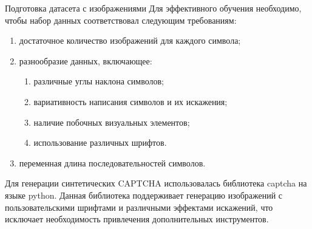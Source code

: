 \documentclass[12pt,a4paper,mathserif]{beamer}
\begin{document}
\begin{frame}{Подготовка датасета с изображениями}
    \setlength{\parindent}{0.5cm}
    Для эффективного обучения необходимо, чтобы набор данных соответствовал следующим требованиям:

    \begin{enumerate}
        \item достаточное количество изображений для каждого символа;
        \item разнообразие данных, включающее:
        \begin{enumerate}
            \item различные углы наклона символов;
            \item вариативность написания символов и их искажения;
            \item наличие побочных визуальных элементов;
            \item использование различных шрифтов.
        \end{enumerate}
        \item переменная длина последовательностей символов.
    \end{enumerate}

    Для генерации синтетических CAPTCHA использовалась библиотека captcha на языке python. Данная библиотека поддерживает генерацию изображений с пользовательскими шрифтами и различными эффектами искажений, что исключает необходимость привлечения дополнительных инструментов.
\end{frame}

\newlength\someheight
\setlength{}
\end{document}
